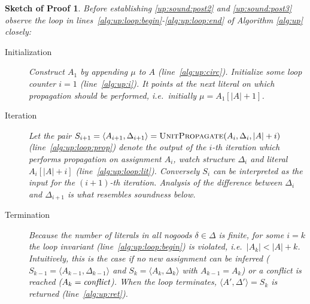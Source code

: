 \documentclass{vutinfth} %
\newtheorem{proof-sketch}{Sketch of Proof}[chapter]
\newcommand{\ass}{A}
\newcommand{\dpm}{\Delta^\pm}
\newcommand{\sgl}{\mu}
\begin{document}
\begin{proof-sketch}


Before establishing \ref{up:sound:post2} and \ref{up:sound:post3} observe the loop in lines~\ref{alg:up:loop:begin}-\ref{alg:up:loop:end} of Algorithm \ref{alg:up} closely:
\begin{description}
\item[Initialization] Construct $A_1$ by appending $\sgl$ to $\ass$ (line~\ref{alg:up:circ}). Initialize some loop counter $i = 1$ (line~\ref{alg:up:i}). It points at the next literal on which propagation should be performed, i.e.~initially $\sgl = \ass_1[|\ass| + 1]$. 

\item[Iteration] Let the pair $S_{i+1} = \langle \ass_{i+1}, \Delta_{i+1} \rangle = \textsc{UnitPropagate}(\ass_i, \Delta_i, |A| + i)$ (line~\ref{alg:up:loop:prop}) denote the output of the $i$-th iteration which performs propagation on assignment $\ass_i$, watch structure $\Delta_i$ and literal $\ass_i[|A| + i]$ (line~\ref{alg:up:loop:lit}). Conversely $S_i$ can be interpreted as the input for the $(i+1)$-th iteration. Analysis of the difference between $\Delta_{i}$ and $\Delta_{i+1}$ is what resembles soundness below.

\item[Termination] Because the number of literals in all nogoods $\delta \in \Delta$ is finite, for some $i = k$ the loop invariant (line~\ref{alg:up:loop:begin}) is violated, i.e.~$|\ass_{k}| < |A| + k$. Intuitively, this is the case if no new assignment can be inferred ($S_{k-1} = \langle \ass_{k-1}, \Delta_{k-1} \rangle$ and $S_k = \langle \ass_k, \Delta_k \rangle$ with $\ass_{k-1} = \ass_k$) or a conflict is reached ($\ass_k = \emph{conflict}$). When the loop terminates, $\langle \ass', \Delta' \rangle = S_k$ is returned (line~\ref{alg:up:ret}).
\end{description}


\end{proof-sketch}
\end{document}
